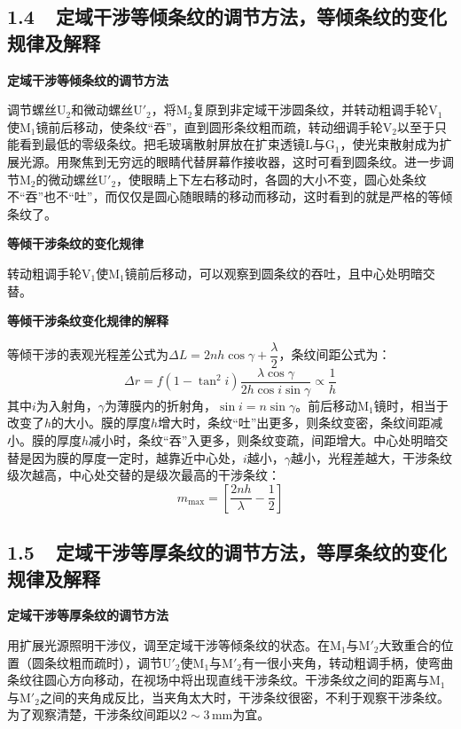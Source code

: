 \documentclass[a4paper,fontset=windows]{ctexart}
\begin{document}
    \subsection*{1.4\ \ 定域干涉等倾条纹的调节方法，等倾条纹的变化规律及解释}

    \textbf{定域干涉等倾条纹的调节方法}

    调节螺丝$\mathrm{U}_2$和微动螺丝$\mathrm{U}'_2$，将$\mathrm{M}_2$复原到非定域干涉圆条纹，并转动粗调手轮$\mathrm{V}_1$使$\mathrm{M}_1$镜前后移动，使条纹“吞”，直到圆形条纹粗而疏，转动细调手轮$\mathrm{V}_2$以至于只能看到最低的零级条纹。把毛玻璃散射屏放在扩束透镜L与$\mathrm{G}_1$，使光束散射成为扩展光源。用聚焦到无穷远的眼睛代替屏幕作接收器，这时可看到圆条纹。进一步调节$\mathrm{M}_2$的微动螺丝$\mathrm{U}'_2$，使眼睛上下左右移动时，各圆的大小不变，圆心处条纹不“吞”也不“吐”，而仅仅是圆心随眼睛的移动而移动，这时看到的就是严格的等倾条纹了。

    \textbf{等倾干涉条纹的变化规律}

    转动粗调手轮$\mathrm{V}_1$使$\mathrm{M}_1$镜前后移动，可以观察到圆条纹的吞吐，且中心处明暗交替。

    \textbf{等倾干涉条纹变化规律的解释}

    等倾干涉的表观光程差公式为$\Delta L = 2nh\cos\gamma + \dfrac{\lambda}{2}$，条纹间距公式为：
    \[
    \Delta r = f(1-\tan^2 i)\frac{\lambda\cos\gamma}{2h\cos i\sin\gamma} \propto \frac{1}{h}
    \]
    其中$i$为入射角，$\gamma$为薄膜内的折射角，$\sin i = n\sin\gamma$。前后移动$\mathrm{M}_1$镜时，相当于改变了$h$的大小。膜的厚度$h$增大时，条纹“吐”出更多，则条纹变密，条纹间距减小。膜的厚度$h$减小时，条纹“吞”入更多，则条纹变疏，间距增大。中心处明暗交替是因为膜的厚度一定时，越靠近中心处，$i$越小，$\gamma$越小，光程差越大，干涉条纹级次越高，中心处交替的是级次最高的干涉条纹：
    \[
    m_{\mathrm{max}} = \left[\frac{2nh}{\lambda} - \frac{1}{2}\right]
    \]

    \subsection*{1.5\ \ 定域干涉等厚条纹的调节方法，等厚条纹的变化规律及解释}

    \textbf{定域干涉等厚条纹的调节方法}

    用扩展光源照明干涉仪，调至定域干涉等倾条纹的状态。在$\mathrm{M}_1$与$\mathrm{M}'_2$大致重合的位置（圆条纹粗而疏时），调节$\mathrm{U}'_2$使$\mathrm{M}_1$与$\mathrm{M}'_2$有一很小夹角，转动粗调手柄，使弯曲条纹往圆心方向移动，在视场中将出现直线干涉条纹。干涉条纹之间的距离与$\mathrm{M}_1$与$\mathrm{M}'_2$之间的夹角成反比，当夹角太大时，干涉条纹很密，不利于观察干涉条纹。为了观察清楚，干涉条纹间距以$2\sim3\,\mathrm{mm}$为宜。
\end{document}
